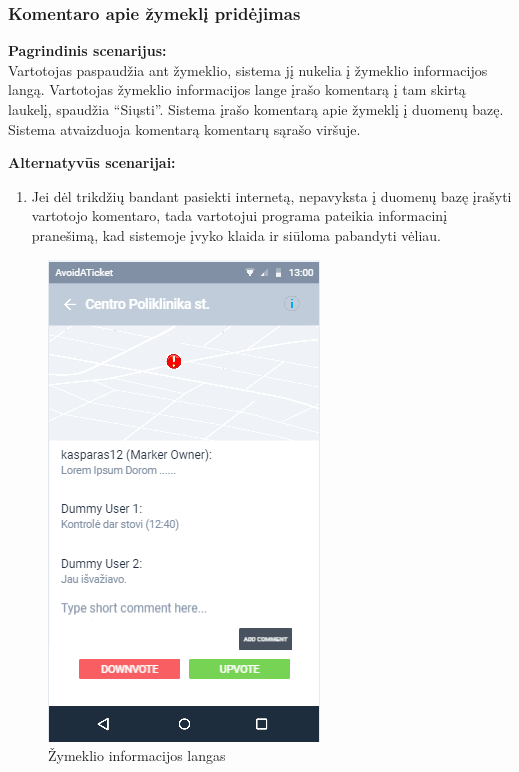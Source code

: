 \documentclass{VUMIFPSkursinis}
\begin{document}
\subsubsection{Komentaro apie žymeklį pridėjimas}
	\textbf{Pagrindinis scenarijus:}\\
    Vartotojas paspaudžia ant žymeklio, sistema jį nukelia į žymeklio informacijos langą. Vartotojas žymeklio informacijos lange 
	įrašo komentarą į tam skirtą laukelį, spaudžia “Siųsti”. Sistema įrašo komentarą apie žymeklį į duomenų bazę. Sistema 
	atvaizduoja komentarą komentarų sąrašo viršuje.

	\textbf{Alternatyvūs scenarijai:}
	\begin{enumerate}[itemsep=-2mm]
		\item Jei dėl trikdžių bandant pasiekti internetą, nepavyksta į duomenų bazę įrašyti vartotojo komentaro, tada vartotojui programa pateikia informacinį pranešimą, kad sistemoje įvyko klaida ir siūloma pabandyti vėliau.
	\end{enumerate} 
	\begin{figure}[H]
				\centering
				\includegraphics[scale=0.6]{img/mockup_markerInfoWindow}
				\caption{Žymeklio informacijos langas}
				\label{img:Žymeklio informacijos langas}
			\end{figure}
\end{document}
